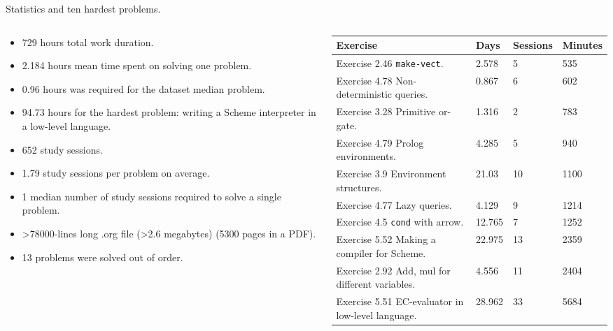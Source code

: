 \documentclass[presentation, CJK, compress,aspectratio=169]{beamer}
\begin{document}
\begin{frame}[label={sec:orgbf134b6},fragile]{Statistics and ten hardest problems.}
 \begin{columns}[t]
\begin{column}{0.5\columnwidth}
\scriptsize
\begin{itemize}
\item \alert{729} hours total work duration.
\item \alert{2.184} hours mean time spent on solving one problem.
\item \alert{0.96} hours was required for the dataset median problem.
\item \alert{94.73} hours for the hardest problem: writing a Scheme interpreter in a low-level language.
\item \alert{652} study sessions.
\item \alert{1.79} study sessions per problem on average.
\item \alert{1} median number of study sessions required to solve a single problem.
\item \alert{>78000}-lines long .org file (\alert{>2.6} megabytes) (5300 pages in a PDF).
\item \alert{13} problems were solved out of order.
\end{itemize}
\end{column}

\begin{column}{0.6\columnwidth}
\vspace{-0.15cm}
\scriptsize
\begin{center}
\begin{supertabular}{p{4cm}|p{0.7cm}|p{0.5cm}|p{0.5cm}}
Exercise & Days & Sessions & Minutes\\
\hline
Exercise 2.46 \texttt{make-vect}. & 2.578 & 5 & 535\\
Exercise 4.78 Non-deterministic queries. & 0.867 & 6 & 602\\
Exercise 3.28 Primitive or-gate. & 1.316 & 2 & 783\\
Exercise 4.79 Prolog environments. & 4.285 & 5 & 940\\
Exercise 3.9 Environment structures. & 21.03 & 10 & 1100\\
Exercise 4.77 Lazy queries. & 4.129 & 9 & 1214\\
Exercise 4.5 \texttt{cond} with arrow. & 12.765 & 7 & 1252\\
Exercise 5.52 Making a compiler for Scheme. & 22.975 & 13 & 2359\\
Exercise 2.92 Add, mul for different variables. & 4.556 & 11 & 2404\\
Exercise 5.51 EC-evaluator in low-level language. & 28.962 & 33 & 5684\\
\end{supertabular}
\end{center}
\end{column}
\end{columns}


\end{frame}
\end{document}
